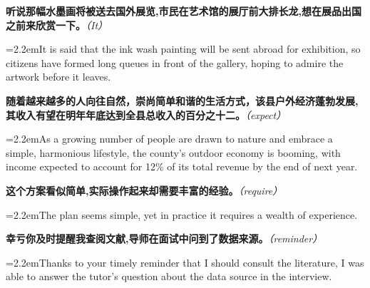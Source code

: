\documentclass[11pt,a4paper]{article}
\newcommand{\num}[1]{\makebox[1.9em][r]{#1.}\hspace{0.3em}}
\newcommand{\prompt}[1]{\emph{\textcolor{tipblue}{\small（#1）}}}
\begin{document}
\begin{minipage}{\linewidth}

\num{7}\textbf{听说那幅水墨画将被送去国外展览,市民在艺术馆的展厅前大排长龙,想在展品出国之前来欣赏一下。}\prompt{It}

\vspace{0.15em}

\noindent\hangindent=2.2em\hspace{2.2em}It is said that the ink wash painting will be sent abroad for exhibition, so citizens have formed long queues in front of the gallery, hoping to admire the artwork before it leaves.

\end{minipage}

\begin{minipage}{\linewidth}

\num{8}\textbf{随着越来越多的人向往自然，崇尚简单和谐的生活方式，该县户外经济蓬勃发展,其收入有望在明年年底达到全县总收入的百分之十二。}\prompt{expect}

\vspace{0.15em}

\noindent\hangindent=2.2em\hspace{2.2em}As a growing number of people are drawn to nature and embrace a simple, harmonious lifestyle, the county’s outdoor economy is booming, with income expected to account for 12\% of its total revenue by the end of next year.

\end{minipage}

\vspace{0.35em}\vspace{0.15em}

\begin{minipage}{\linewidth}

\num{9}\textbf{这个方案看似简单,实际操作起来却需要丰富的经验。}\prompt{require}

\vspace{0.15em}

\noindent\hangindent=2.2em\hspace{2.2em}The plan seems simple, yet in practice it requires a wealth of experience.

\end{minipage}

\begin{minipage}{\linewidth}

\num{10}\textbf{幸亏你及时提醒我查阅文献,导师在面试中问到了数据来源。}\prompt{reminder}

\vspace{0.15em}

\noindent\hangindent=2.2em\hspace{2.2em}Thanks to your timely reminder that I should consult the literature, I was able to answer the tutor’s question about the data source in the interview.

\end{minipage}
\end{document}
